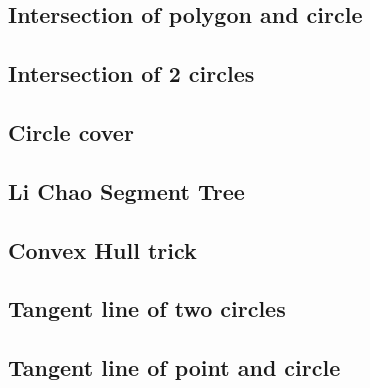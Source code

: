 \documentclass[a4paper,10pt,twocolumn,oneside]{article}
\begin{document}
%

\subsection{Intersection of polygon and circle}


\subsection{Intersection of 2 circles}
\subsection{Circle cover}


%

\subsection{Li Chao Segment Tree}


\subsection{Convex Hull trick}


%

\subsection{Tangent line of two circles}


\subsection{Tangent line of point and circle}

\end{document}
